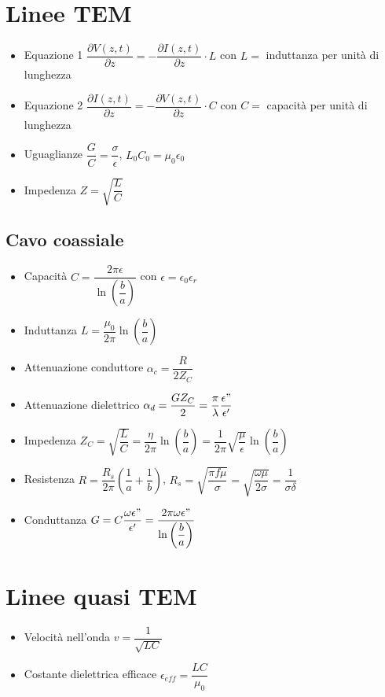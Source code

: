 \documentclass{article}
\begin{document}
\section{Linee TEM}
\begin{itemize}
	\item Equazione 1 \( \dfrac{\partial V(z, t)}{\partial z} = - \dfrac{\partial I(z, t)}{\partial z} \cdot L\) con \(L = \) induttanza per unità di lunghezza
	\item Equazione 2 \( \dfrac{\partial I(z, t)}{\partial z} = - \dfrac{\partial V(z, t)}{\partial z} \cdot C\) con \(C = \) capacità per unità di lunghezza
	\item Uguaglianze \( \dfrac{G}{C} = \dfrac{\sigma}{\epsilon} \), \(L_0 C_0 = \mu_0 \epsilon_0  \)
	\item Impedenza \( Z = \sqrt{\dfrac{L}{C}} \)
\end{itemize}

\subsection{Cavo coassiale}
\begin{itemize}
	\item Capacità \( C = \dfrac{2 \pi \epsilon}{\ln\left(\dfrac{b}{a}\right)} \) con \( \epsilon = \epsilon_0 \epsilon_r \)
	\item Induttanza \( L = \dfrac{\mu_0}{2 \pi} \ln\left(\dfrac{b}{a}\right) \)
	\item Attenuazione conduttore \( \alpha_c = \dfrac{R}{2 Z_C} \)
	\item Attenuazione dielettrico \( \alpha_d = \dfrac{G Z_C}{2} = \dfrac{\pi}{\lambda}\dfrac{\epsilon"}{\epsilon'}\)
	\item Impedenza \( Z_C = \sqrt{\dfrac{L}{C}} = \dfrac{\eta}{2 \pi} \ln\left(\dfrac{b}{a} \right) =  \dfrac{1}{2 \pi} \sqrt{\dfrac{\mu}{\epsilon}} \ln\left(\dfrac{b}{a}\right)\)
	\item Resistenza \( R = \dfrac{R_s}{2 \pi} \left( \dfrac{1}{a} + \dfrac{1}{b} \right) \), \( R_s = \sqrt{\dfrac{\pi f \mu}{\sigma}} = \sqrt{\dfrac{\omega \mu}{2 \sigma}} = \dfrac{1}{\sigma \delta} \)
	\item Conduttanza \( G = C \dfrac{\omega\epsilon"}{\epsilon'} = \dfrac{2 \pi \omega \epsilon"}{\ln\left(\dfrac{b}{a} \right)} \)
\end{itemize}

\section{Linee quasi TEM}
\begin{itemize}
	\item Velocità nell'onda \( v = \dfrac{1}{\sqrt{LC}} \)
	\item Costante dielettrica efficace \( \epsilon_{eff} = \dfrac{LC}{\mu_0} \)
\end{itemize}
\end{document}
